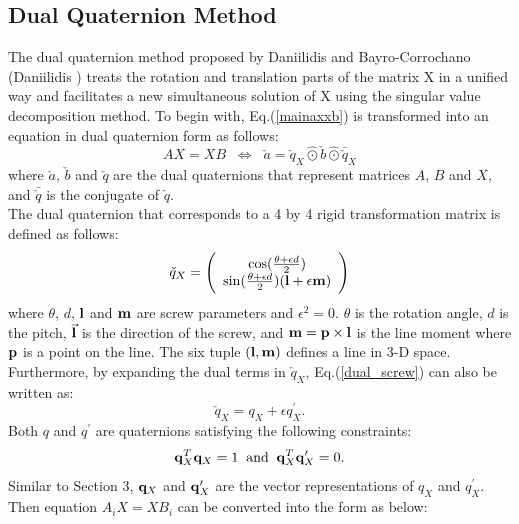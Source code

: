 \documentclass[twocolumn,10pt]{asme2ej}
\begin{document}
\subsection{Dual Quaternion Method }
The dual quaternion method proposed by Daniilidis and Bayro-Corrochano \cite{daniilidis1996dual} (Daniilidis \cite{daniilidis1999hand}) treats the rotation and translation parts of the matrix X in a unified way and facilitates a new simultaneous solution of X using the singular value decomposition method. To begin with, Eq.(\ref{mainaxxb}) is transformed into an equation in dual quaternion form as follows:
\begin{equation}
AX = XB 
\; \;
\Leftrightarrow
\; \;
\check{a} = \check{q}_{X}\hat{\odot}\check{b}\hat{\odot}\bar{\check{q}}_{X}
\label{DualQuaternion}
\end{equation}
where $\check{a}$, $\check{b}$ and $\check{q}$ are the dual quaternions that represent matrices $A$, $B$ and $X$, and $\bar{\check{q}}$ is the conjugate of $\check{q}$.\\
The dual quaternion that corresponds to a 4 by 4 rigid transformation matrix is defined as follows:
\begin{equation}
\check{q}_{X} =
\Bigg( 
\begin{array}{c}
\cos(\frac{\theta + \epsilon d}{2})\\
\sin(\frac{\theta + \epsilon d}{2})({\bf l} + \epsilon {\bf m})
\end{array}
\Bigg)
\label{dual_screw}
\end{equation}
where
$\theta$, $d$, ${\bf l}$ and ${\bf m}$ are screw parameters and ${\epsilon}^{2} = 0$. $\theta$ is the rotation angle, $d$ is the pitch, $\vec{\bf l}$ is the direction of the screw, and ${\bf m} = {\bf p} \times {\bf l}$ is the line moment where ${\bf p}$ is a point on the line. The six tuple $({\bf l}, {\bf m})$ defines a line in 3-D space. Furthermore, by expanding the dual terms in $\check{q}_{X}$, Eq.(\ref{dual_screw}) can also be written as:
\begin{equation}
\check{q}_{X} = q_{X} + \epsilon {q}^{\prime}_{X}.
\end{equation} 
Both $q$ and $q^{\prime}$ are quaternions satisfying the following constraints:
\begin{equation}
{\bf q}^{T}_{X}{\bf q}_{X} = 1 \; \; \text{and} \;
\; {\bf q}^{T}_{X}{\bf q}^{\prime}_{X} = 0.
\end{equation}
Similar to Section 3, ${\bf q}_{X}$ and ${\bf q}^{\prime}_{X}$ are the vector representations of $q_{X}$ and $q^{\prime}_{X}$.
Then equation $A_{i}X = XB_{i}$ can be converted into the form as below:
\end{document}
